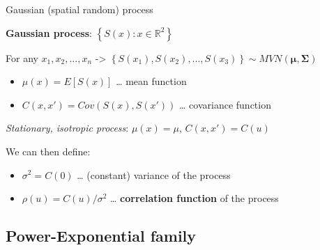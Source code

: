 \documentclass[
  ignorenonframetext,
]{beamer}
\providecommand{\tightlist}{%
  \setlength{\itemsep}{0pt}\setlength{\parskip}{0pt}}
\begin{document}
\begin{frame}{Gaussian (spatial random) process}
\small

\textbf{Gaussian process}: \(\left\{S(x):x\in \mathbb{R}^2\right\}\)

For any \(x_1,x_2,...,x_n\) -\textgreater{}
\(\left\{S(x_1),S(x_2),...,S(x_3)\right\}\sim MVN(\boldsymbol\mu, \boldsymbol\Sigma)\)

\begin{itemize}
\item
  \(\mu(x) = E\left[S(x)\right]\) \ldots{} mean function
\item
  \(C(x,x')=Cov\left(S(x),S(x')\right)\) \ldots{} covariance function
\end{itemize}

\emph{Stationary, isotropic process}: \(\mu(x)=\mu\), \(C(x,x')=C(u)\)

We can then define:

\begin{itemize}
\tightlist
\item
  \(\sigma^2=C(0)\) \ldots{} (constant) variance of the process
\end{itemize}

\begin{itemize}
\tightlist
\item
  \(\rho(u)=C(u)/\sigma^2\) \ldots{} \textbf{correlation function} of
  the process
\end{itemize}
\end{frame}

\hypertarget{power-exponential-family}{%
\subsection{Power-Exponential family}\label{power-exponential-family}}
\end{document}
